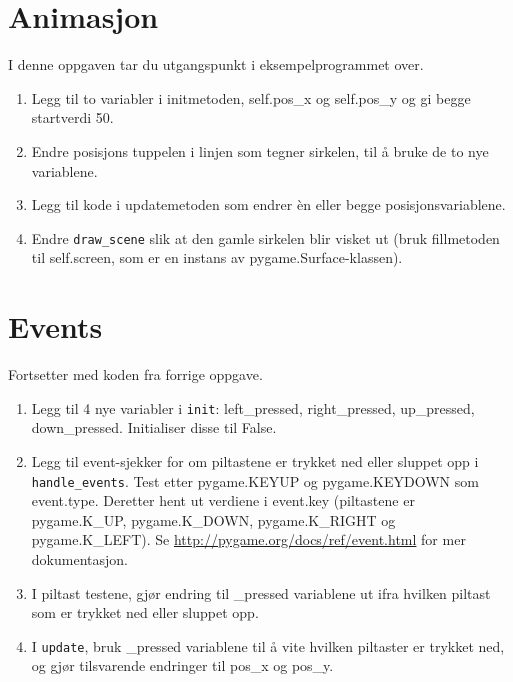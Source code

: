 \documentclass[12pt, norsk, a4paper]{article}
\begin{document}
\section{Animasjon}
I denne oppgaven tar du utgangspunkt i eksempelprogrammet over.
\begin{enumerate}
\item Legg til to variabler i initmetoden, self.pos\_x og self.pos\_y og gi begge
startverdi 50.
\item Endre posisjons tuppelen i linjen som tegner sirkelen, til å 
bruke de to nye variablene.
\item Legg til kode i updatemetoden som endrer èn eller begge posisjonsvariablene.
\item Endre \texttt{draw\_scene} slik at den gamle sirkelen blir visket ut
(bruk fillmetoden til self.screen, som er en instans av pygame.Surface-klassen).
\end{enumerate}

\section{Events}
Fortsetter med koden fra forrige oppgave.
\begin{enumerate}
\item Legg til 4 nye variabler i \texttt{init}: left\_pressed, right\_pressed, up\_pressed, down\_pressed.
Initialiser disse til False.
\item Legg til event-sjekker for om piltastene er trykket ned eller sluppet opp
i \texttt{handle\_events}. Test etter pygame.KEYUP og pygame.KEYDOWN som event.type.
Deretter hent ut verdiene i event.key (piltastene er pygame.K\_UP, pygame.K\_DOWN, pygame.K\_RIGHT og pygame.K\_LEFT).
Se \url{http://pygame.org/docs/ref/event.html} for mer dokumentasjon.

\item I piltast testene, gjør endring til \_pressed variablene ut ifra hvilken piltast som er trykket ned eller sluppet opp.

\item I \texttt{update}, bruk \_pressed variablene til å vite hvilken piltaster er trykket ned, og gjør tilsvarende endringer til pos\_x og pos\_y.
\end{enumerate}
\end{document}

